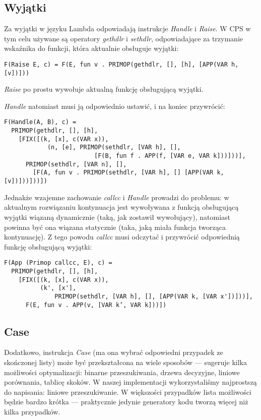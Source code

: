 \documentclass[11pt]{scrartcl}
\begin{document}
\subsection{Wyjątki}
Za wyjątki w języku  Lambda odpowiadają instrukcje \textit{Handle} i \textit{Raise}. W CPS w tym
celu używane są operatory \textit{gethdlr} i \textit{sethdlr}, odpowiadające za trzymanie
wskaźnika do funkcji, która aktualnie obsługuje wyjątki:
\begin{lstlisting}
F(Raise E, c) = F(E, fun v . PRIMOP(gethdlr, [], [h], [APP(VAR h, [v])]))
\end{lstlisting}
\textit{Raise} po prostu wywołuje aktualną funkcję obsługującą wyjątki.

\textit{Handle} natomiast musi ją odpowiednio ustawić, i na koniec przywrócić:
\begin{lstlisting}
F(Handle(A, B), c) =
  PRIMOP(gethdlr, [], [h],
    [FIX([(k, [x], c(VAR x)),
            (n, [e], PRIMOP(sethdlr, [VAR h], [],
                         [F(B, fun f . APP(f, [VAR e, VAR k]))]))],
      PRIMOP(sethdlr, [VAR n], [],
        [F(A, fun v . PRIMOP(sethdlr, [VAR h], [] [APP(VAR k, [v])]))]))])
\end{lstlisting}

Jednakże wzajemne zachowanie \textit{callcc} i \textit{Handle} prowadzi do problemu: w aktualnym rozwiązaniu
kontynuacja jest wywoływana z funkcją obsługującą wyjątki wiązaną dynamicznie
(taką, jak zostawił wywołujący), natomiast powinna być ona wiązana statycznie
(taka, jaką miała funkcja tworząca kontynuację). Z tego powodu \textit{callcc} musi
odczytać i przywrócić odpowiednią funkcję obsługującą wyjątki:
\begin{lstlisting}
F(App (Primop callcc, E), c) =
  PRIMOP(gethdlr, [], [h],
    [FIX([(k, [x], c(VAR x)),
          (k', [x'], 
              PRIMOP(sethdlr, [VAR h], [], [APP(VAR k, [VAR x'])]))],
      F(E, fun v . APP(v, [VAR k’, VAR k]))])
\end{lstlisting}

\subsection{Case}
Dodatkowo, instrukcja \textit{Case} (ma ona
wybrać odpowiedni przypadek ze skończonej listy) może być przekształcona na
wiele sposobów  --- \cite{Appel5.7} sugeruje kilka
możliwości optymalizacji: binarne przeszukiwania, drzewa decyzyjne, liniowe
porównania, tablicę skoków. W naszej implementacji wykorzystaliśmy najprostszą
do napisania: liniowe przeszukiwanie. W większości przypadków lista możliwości
będzie bardzo krótka --- praktycznie jedynie generatory kodu tworzą więcej niż
kilka przypadków.
\end{document}
